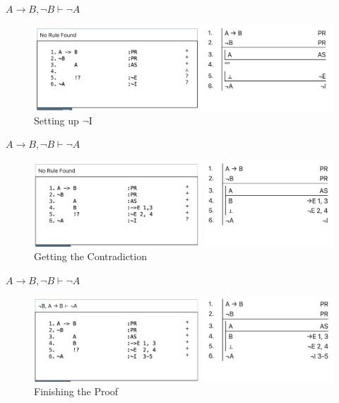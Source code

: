 \documentclass[
  ignorenonframetext,
]{beamer}
\renewcommand{\,}{\text{, }}
\begin{document}
\begin{frame}{\(A \rightarrow B, \neg B \vdash \neg A\)}
\protect\hypertarget{a-rightarrow-b-neg-b-vdash-neg-a-1}{}
\begin{figure}
\centering
\includegraphics[width=\textwidth,height=0.75\textheight]{5_4o.png}
\caption{Setting up \(\neg\)I}
\end{figure}
\end{frame}

\begin{frame}{\(A \rightarrow B, \neg B \vdash \neg A\)}
\protect\hypertarget{a-rightarrow-b-neg-b-vdash-neg-a-2}{}
\begin{figure}
\centering
\includegraphics[width=\textwidth,height=0.75\textheight]{5_4p.png}
\caption{Getting the Contradiction}
\end{figure}
\end{frame}

\begin{frame}{\(A \rightarrow B, \neg B \vdash \neg A\)}
\protect\hypertarget{a-rightarrow-b-neg-b-vdash-neg-a-3}{}
\begin{figure}
\centering
\includegraphics[width=\textwidth,height=0.75\textheight]{5_4q.png}
\caption{Finishing the Proof}
\end{figure}
\end{frame}
\end{document}
